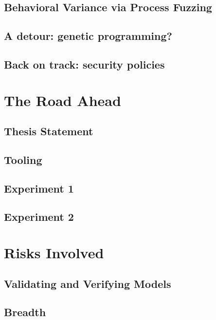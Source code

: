 \documentclass[draft,12pt]{article}
\begin{document}
\subsection{Behavioral Variance via Process Fuzzing}

\subsection{A detour: genetic programming?}

\subsection{Back on track: security policies}



\section{The Road Ahead}  %

\subsection{Thesis Statement}

\subsection{Tooling}

\subsection{Experiment 1}

\subsection{Experiment 2}



\section{Risks Involved}

\subsection{Validating and Verifying Models}

\subsection{Breadth}


\newpage  %

\end{document}

